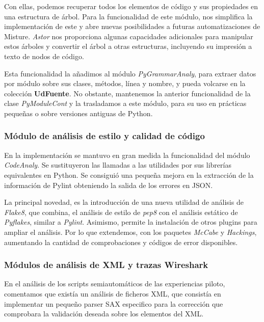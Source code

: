 Con ellas, podemos recuperar todos los elementos de código y sus propiedades en una estructura de árbol. Para la funcionalidad de este módulo, nos simplifica la implementación de este y abre nuevas posibilidades a futuras automatizaciones de Misture. \textit{Astor} nos proporciona algunas capacidades adicionales para manipular estos árboles y convertir el árbol a otras estructuras, incluyendo su impresión a texto de nodos de código.


Esta funcionalidad la añadimos al módulo \textit{PyGrammarAnaly}, para extraer datos por módulo sobre sus clases, métodos, línea y nombre, y pueda volcarse en la colección \textbf{UdFuente}. No obstante, mantenemos la anterior funcionalidad de la clase \textit{PyModuleCont} y la trasladamos a este módulo, para su uso en prácticas pequeñas o sobre versiones antiguas de Python.


\subsubsection{Módulo de análisis de estilo y calidad de código} 
\label{subsec:mod_anal_codigo}

En la implementación se mantuvo en gran medida la funcionalidad del módulo \textit{CodeAnaly}. Se sustituyeron las llamadas a las utilidades por sus librerías equivalentes en Python. Se consiguió una pequeña mejora en la extracción de la información de Pylint obteniendo la salida de los errores en JSON.


La principal novedad, es la introducción de una nueva utilidad de análisis de \textit{Flake8}, que combina, el análisis de estilo de \textit{pep8} con el análisis estático de \textit{Pyflakes}, similar a \textit{Pylint}. Asimismo, permite la instalación de otros plugins para ampliar el análisis. Por lo que extendemos, con los paquetes \textit{McCabe} y \textit{Hackings}, aumentando la cantidad de comprobaciones y códigos de error disponibles.


\subsubsection{Módulos de análisis de XML y trazas Wireshark}
\label{subsec:mod_anal_xml_wireshark}

En el análisis de los scripts semiautomáticos de las experiencias piloto, comentamos que existía un análisis de ficheros XML, que consistía en implementar un pequeño parser SAX especifico para la corrección que comprobara la validación deseada sobre los elementos del XML.


